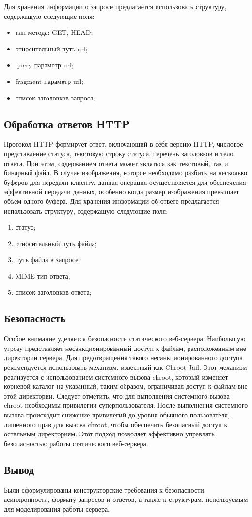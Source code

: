 Для хранения информации о запросе предлагается использовать структуру, содержащую следующие поля:
\begin{itemize}
 \item тип метода: GET, HEAD;
 \item относительный путь url;
 \item query параметр url;
 \item fragment параметр url;
 \item список заголовков запроса;
\end{itemize}

\subsection{Обработка ответов HTTP}

Протокол HTTP формирует ответ, включающий в себя версию HTTP, числовое представление статуса, текстовую строку статуса, перечень заголовков и тело ответа. 
При этом, содержанием ответа может являться как текстовый, так и бинарный файл. 
В случае изображения, которое необходимо разбить на несколько буферов для передачи клиенту, данная операция осуществляется для
обеспечения эффективной передачи данных, особенно когда размер изображения превышает объем одного буфера.
Для хранения информации об ответе предлагается использовать структуру, содержащую следующие поля:

\begin{enumerate}
  \item статус;
 \item относительный путь файла;
 \item путь файла в запросе;
 \item MIME тип ответа;
 \item список заголовков ответа;
\end{enumerate}

\subsection{Безопасность}

Особое внимание уделяется безопасности статического веб-сервера. 
Наибольшую угрозу представляет несанкционированный доступ к файлам, расположенным вне директории сервера. 
Для предотвращения такого несанкционированного доступа рекомендуется использовать механизм, известный как Chroot Jail. 
Этот механизм реализуется с использованием системного вызова chroot, который изменяет корневой каталог на указанный, таким образом, ограничивая доступ к файлам вне этой директории. 
Следует отметить, что для выполнения системного вызова chroot необходимы привилегии суперпользователя. 
После выполнения системного вызова происходит снижение привилегий до уровня обычного пользователя, лишенного прав для вызова chroot, чтобы обеспечить безопасный доступ к остальным директориям. 
Этот подход позволяет эффективно управлять безопасностью работы статического веб-сервера.

\subsection*{Вывод}

Были сформулированы конструкторские требования к безопасности, асинхронности, формату запросов и ответов, а также к структурам, используемым для моделирования работы сервера.

\clearpage
